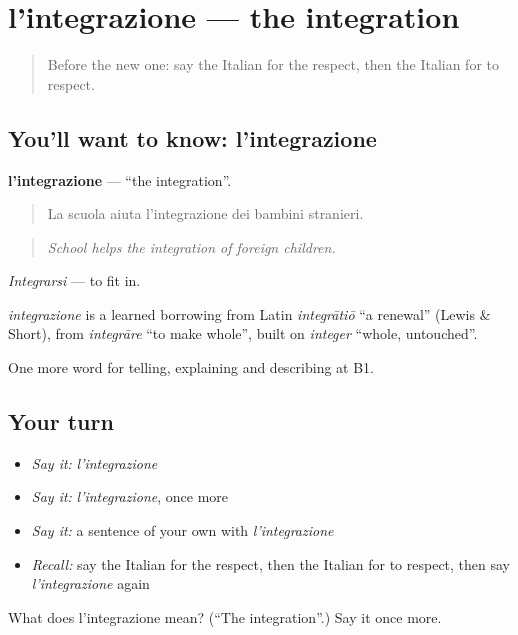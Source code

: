 \section[l'integrazione]{l'integrazione — the integration}

\label{lesson:IT-C368-integrazione}



\begin{quote}
Before the new one: say the Italian for the respect, then the Italian for to respect.
\end{quote}

\subsection*{You'll want to know: l'integrazione}
\textbf{l'integrazione} — \textquotedblleft{}the integration\textquotedblright{}.

\begin{quote}
La scuola aiuta l'integrazione dei bambini stranieri.
\end{quote}

\begin{quote}
\emph{School helps the integration of foreign children.}
\end{quote}

\emph{Integrarsi} — to fit in.

\begin{cousinweb}
\emph{integrazione} is a learned borrowing from Latin \emph{integrātiō} \textquotedblleft{}a renewal\textquotedblright{} (Lewis \& Short), from \emph{integrāre} \textquotedblleft{}to make whole\textquotedblright{}, built on \emph{integer} \textquotedblleft{}whole, untouched\textquotedblright{}.
\end{cousinweb}

\begin{grammarlens}[title={What you've built}]
One more word for telling, explaining and describing at B1.
\end{grammarlens}

\subsection*{Your turn}
\begin{itemize}
\raggedright
  \item \emph{Say it:} \emph{l'integrazione}
  \item \emph{Say it:} \emph{l'integrazione}, once more
  \item \emph{Say it:} a sentence of your own with \emph{l'integrazione}
  \item \emph{Recall:} say the Italian for the respect, then the Italian for to respect, then say \emph{l'integrazione} again
\end{itemize}

\begin{tcolorbox}[breakable,colback=teal!4,colframe=teal!35!black,title={Before you move on}]
What does l'integrazione mean? (\textquotedblleft{}The integration\textquotedblright{}.) Say it once more.
\end{tcolorbox}
